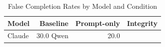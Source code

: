 \begin{table}[htbp]
\centering
\caption{False Completion Rates by Model and Condition}
\label{tab:fc-rates}
\begin{tabular}{lrrr}
\toprule
Model & Baseline & Prompt-only & Integrity \\
\midrule
Claude & 30.0%
Qwen & 20.0%
\bottomrule
\end{tabular}
\end{table}
